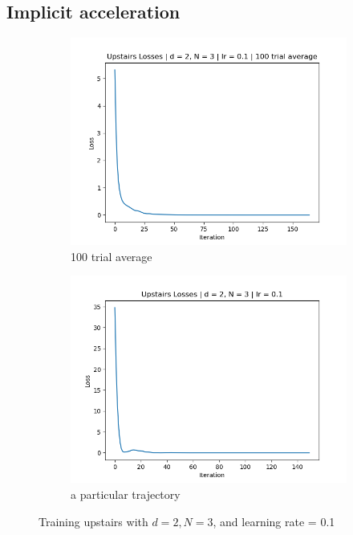 \documentclass[11pt]{article}
\begin{document}
\subsection{Implicit acceleration}
\begin{figure}[ht]
    \begin{subfigure}{0.5\textwidth}
        \centering
        \includegraphics[width=\textwidth]{images/upstairs_avg.png}
        \caption{100 trial average}
        \label{fig:upstairs_avg}
    \end{subfigure}
    \begin{subfigure}{0.5\textwidth}
        \centering
        \includegraphics[width=\textwidth]{images/upstairs_1.png}
        \caption{a particular trajectory}
        \label{fig:upstairs_1}
    \end{subfigure}
    \caption{Training upstairs with $d = 2, N = 3$, and learning rate = 0.1}
    \label{fig:upstairs}
\end{figure}
\end{document}
